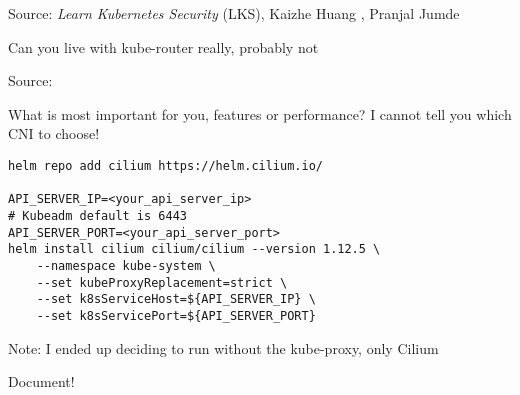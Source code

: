 \documentclass[Screen16to9,17pt]{foils}
\begin{document}

Source: \emph{Learn Kubernetes Security} (LKS), Kaizhe Huang , Pranjal Jumde

\begin{list2}
\item Can you live with kube-router really, probably not
\end{list2}


Source:  

\begin{list2}
\item What is most important for you, features or performance? I cannot tell you which CNI to choose!
\end{list2}


\begin{verbatim}
helm repo add cilium https://helm.cilium.io/

API_SERVER_IP=<your_api_server_ip>
# Kubeadm default is 6443
API_SERVER_PORT=<your_api_server_port>
helm install cilium cilium/cilium --version 1.12.5 \
    --namespace kube-system \
    --set kubeProxyReplacement=strict \
    --set k8sServiceHost=${API_SERVER_IP} \
    --set k8sServicePort=${API_SERVER_PORT}
\end{verbatim}

\begin{list2}
\item Note: I ended up deciding to run without the kube-proxy, only Cilium
\item Document!
\end{list2}



\end{document}
